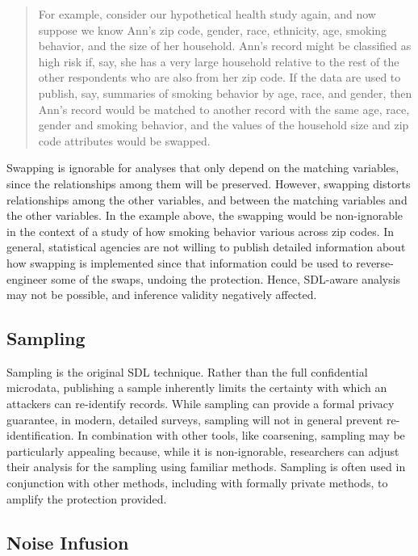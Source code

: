 \documentclass[
]{book}
\begin{document}
\begin{quote}
For example, consider our hypothetical health study again, and now suppose we know Ann's zip code, gender, race, ethnicity, age, smoking behavior, and the size of her household. Ann's record might be classified as high risk if, say, she has a very large household relative to the rest of the other respondents who are also from her zip code. If the data are used to publish, say, summaries of smoking behavior by age, race, and gender, then Ann's record would be matched to another record with the same age, race, gender and smoking behavior, and the values of the household size and zip code attributes would be swapped.
\end{quote}

Swapping is ignorable for analyses that only depend on the matching variables, since the relationships among them will be preserved. However, swapping distorts relationships among the other variables, and between the matching variables and the other variables. In the example above, the swapping would be non-ignorable in the context of a study of how smoking behavior various across zip codes. In general, statistical agencies are not willing to publish detailed information about how swapping is implemented since that information could be used to reverse-engineer some of the swaps, undoing the protection. Hence, SDL-aware analysis may not be possible, and inference validity negatively affected.

\hypertarget{sampling}{%
\subsection{Sampling}\label{sampling}}

Sampling is the original SDL technique. Rather than the full confidential microdata, publishing a sample inherently limits the certainty with which an attackers can re-identify records.
While sampling can provide a formal privacy guarantee, in modern, detailed surveys, sampling will not in general prevent re-identification. In combination with other tools, like coarsening, sampling may be particularly appealing because, while it is non-ignorable, researchers can adjust their analysis for the sampling using familiar methods. Sampling is often used in conjunction with other methods, including with formally private methods, to amplify the protection provided.

\hypertarget{noise-infusion}{%
\subsection{Noise Infusion}\label{noise-infusion}}
\end{document}
